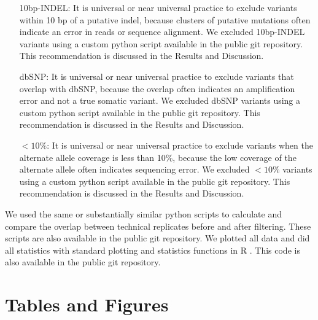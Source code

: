 \documentclass[11 pt]{article} %
\begin{document}
\begin{itemize}
\item[10bp-INDEL:] It is universal or near universal practice to exclude variants within 10 bp of a putative indel, because clusters of putative mutations often indicate an error in reads or sequence alignment. We excluded 10bp-INDEL variants using a custom python script available in the public git repository. This recommendation is discussed in the Results and Discussion.
\item[dbSNP:] It is universal or near universal practice to exclude variants that overlap with dbSNP, because the overlap often indicates an amplification error and not a true somatic variant. We excluded dbSNP variants using a custom python script available in the public git repository. This recommendation is discussed in the Results and Discussion.
\item[$<10\%$:] It is universal or near universal practice to exclude variants when the alternate allele coverage is less than 10\%, because the low coverage of the alternate allele often indicates sequencing error. We excluded $<10\%$ variants using a custom python script available in the public git repository. This recommendation is discussed in the Results and Discussion.
\end{itemize}

We used the same or substantially similar python scripts to calculate and compare the overlap between technical replicates before and after filtering. These scripts are also available in the public git repository. We plotted all data and did all statistics with standard plotting and statistics functions in R \citep{Rsoftware}. This code is also available in the public git repository.  





\cleardoublepage
\section*{Tables and Figures}
\end{document}
